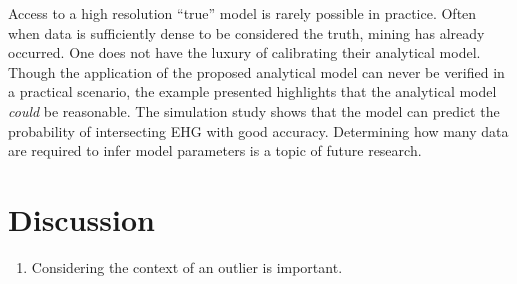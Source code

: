 

Access to a high resolution ``true'' model is rarely possible in practice. Often when data is sufficiently dense to be considered the truth, mining has already occurred. One does not have the luxury of calibrating their analytical model. Though the application of the proposed analytical model can never be verified in a practical scenario, the example presented highlights that the analytical model \emph{could} be reasonable. The simulation study shows that the model can predict the probability of intersecting EHG with good accuracy. Determining how many data are required to infer model parameters is a topic of future research.

\FloatBarrier
\section{Discussion}
\label{sec:02discuss}

\begin{enumerate}
    \item Considering the context of an outlier is important.
\end{enumerate}